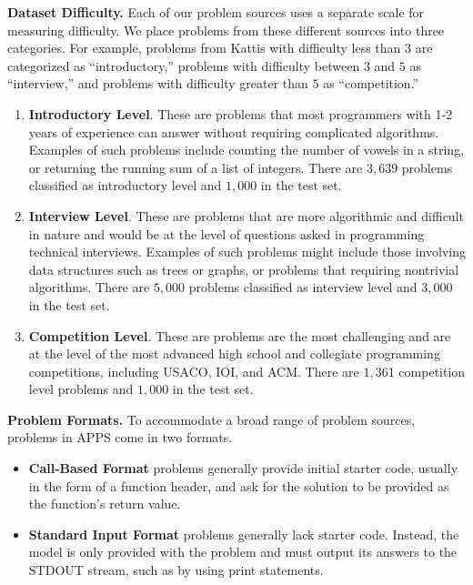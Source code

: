 \noindent\textbf{Dataset Difficulty.}\quad
Each of our problem sources uses a separate scale for measuring difficulty. We place problems from these different sources into three categories. For example, problems from Kattis with difficulty less than $3$ are categorized as ``introductory,'' problems with difficulty between $3$ and $5$ as ``interview,'' and problems with difficulty greater than $5$ as ``competition.''

\begin{enumerate}
    \item \textbf{Introductory Level}. These are problems that most programmers with 1-2 years of experience can answer without requiring complicated algorithms. Examples of such problems include counting the number of vowels in a string, or returning the running sum of a list of integers. There are $3,\!639$ problems classified as introductory level and $1,\!000$ in the test set.
    \item \textbf{Interview Level}. These are problems that are more algorithmic and difficult in nature and would be at the level of questions asked in programming technical interviews. Examples of such problems might include those involving data structures such as trees or graphs, or problems that requiring nontrivial algorithms. There are $5,\!000$ problems classified as interview level and $3,\!000$ in the test set.
    \item \textbf{Competition Level}. These are problems are the most challenging and are at the level of the most advanced high school and collegiate programming competitions, including USACO, IOI, and ACM. There are $1,\!361$ competition level problems and $1,\!000$ in the test set.
\end{enumerate}








\noindent\textbf{Problem Formats.}\quad 
To accommodate a broad range of problem sources, problems in APPS come in two formats.
\begin{itemize}
    \item \textbf{Call-Based Format} problems generally provide initial starter code, usually in the form of a function header, and ask for the solution to be provided as the function's return value.
    \item \textbf{Standard Input Format} problems generally lack starter code. Instead, the model is only provided with the problem and must output its answers to the STDOUT stream, such as by using print statements.
\end{itemize}

